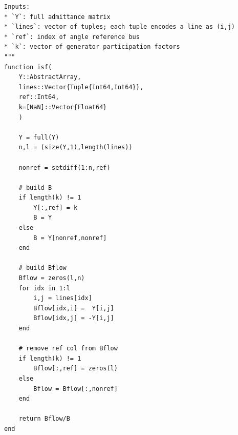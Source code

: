 \documentclass[10pt,letterpaper]{article}
\begin{document}
\begin{verbatim}
Inputs:
* `Y`: full admittance matrix
* `lines`: vector of tuples; each tuple encodes a line as (i,j)
* `ref`: index of angle reference bus
* `k`: vector of generator participation factors
"""
function isf(
    Y::AbstractArray,
    lines::Vector{Tuple{Int64,Int64}},
    ref::Int64,
    k=[NaN]::Vector{Float64}
    )
    
    Y = full(Y)
    n,l = (size(Y,1),length(lines))
    
    nonref = setdiff(1:n,ref)
    
    # build B
    if length(k) != 1
        Y[:,ref] = k
        B = Y
    else
        B = Y[nonref,nonref]
    end
    
    # build Bflow
    Bflow = zeros(l,n)
    for idx in 1:l
        i,j = lines[idx]
        Bflow[idx,i] =  Y[i,j]
        Bflow[idx,j] = -Y[i,j]
    end
    
    # remove ref col from Bflow
    if length(k) != 1
        Bflow[:,ref] = zeros(l)
    else
        Bflow = Bflow[:,nonref]
    end
    
    return Bflow/B
end
\end{verbatim}
\end{document}
